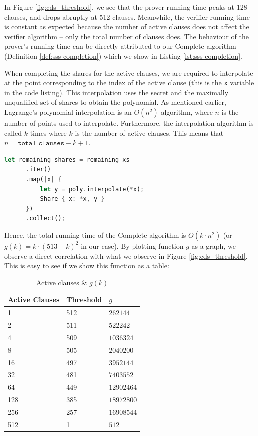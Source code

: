 In Figure \ref{fig:cds_threshold}, we see that the
prover running time peaks at 128 clauses, and drops abruptly at 512 clauses. Meanwhile, 
the verifier running time is constant as expected because the number of active clauses does not affect the verifier algorithm -- only the total number of clauses does.
The behaviour of the prover's running time can be directly attributed to 
our \textsf{Complete} algorithm (Definition \ref{def:sss-completion})
which we show in Listing \ref{lst:sss-completion}.

When completing the shares for the active clauses, we are required to interpolate 
at the point corresponding to the index of the active clause (this is the \texttt{x}
variable in the code listing). This interpolation 
uses the secret and the maximally unqualified set of shares to obtain the 
polynomial. As mentioned earlier, Lagrange's polynomial interpolation is an 
$O(n^2)$ algorithm, where $n$ is the number of points used to interpolate. 
Furthermore, the interpolation algorithm is called $k$ times where $k$ is the number of active 
clauses. This means that $n = \texttt{total clauses} - k + 1$. 

\begin{lstlisting}[language=rust, caption={Share Completion Algorithm},label={lst:sss-completion}]
  let remaining_shares = remaining_xs
      .iter()
      .map(|x| {
          let y = poly.interpolate(*x);
          Share { x: *x, y }
      })
      .collect();
\end{lstlisting}

Hence, the total running time of the \textsf{Complete} algorithm is $O(k \cdot n^2)$ (or
$g(k) = k \cdot (513 - k)^2$ in our case). By plotting function $g$ as a graph, we observe a 
direct correlation with what we observe in Figure \ref{fig:cds_threshold}. This is 
easy to see if we show this function as a table:

\begin{table}[H]
  \centering\caption{Active clauses \& $g(k)$}
  \vspace{0.5em}
  \begin{tabular}{lll}
    \toprule
    \textbf{Active Clauses} & \textbf{Threshold} & \textbf{$g$} \\
    \midrule
    1  & 512  & $262144$  \\
    2  & 511  & $522242$  \\
    4  & 509  & $1036324$  \\
    8  & 505  & $2040200$  \\
    16 & 497  & $3952144$ \\
    32 & 481  & $7403552$ \\
    64 & 449  & $12902464$ \\
    128 & 385 & $18972800$\\
    256 & 257 & $16908544$ \\
    512 & 1   & $512$ \\
    \bottomrule
  \end{tabular}
\end{table}

